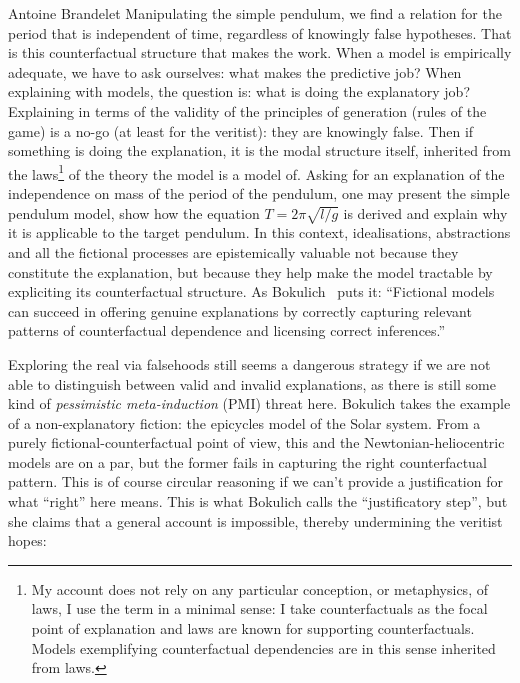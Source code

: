 \begin{artengenv}{Antoine Brandelet}
Manipulating the simple pendulum, we find a relation for the period that is independent of time, regardless of knowingly false hypotheses. That is this counterfactual structure that makes the work. When a model is empirically adequate, we have to ask ourselves: what makes the predictive job? When explaining with models, the question is: what is doing the explanatory job? Explaining in terms of the validity of the principles of generation (rules of the game) is a no-go (at least for the veritist): they are knowingly false. Then if something is doing the explanation, it is the modal structure itself, inherited from the laws\footnote{My account does not rely on any particular conception, or metaphysics, of laws, I use the term in a minimal sense: I take counterfactuals as the focal point of explanation and laws are known for supporting counterfactuals. Models exemplifying counterfactual dependencies are in this sense inherited from laws.} of the theory the model is a model of. Asking for an explanation of the independence on mass of the period of the pendulum, one may present the simple pendulum model, show how the equation $T = 2\pi \sqrt{l/g}$ is derived and explain why it is applicable to the target pendulum. In this context, idealisations, abstractions and all the fictional processes are epistemically valuable not because they constitute the explanation, but because they help make the model tractable by expliciting its counterfactual structure. As Bokulich~\parencite*[p.1]{Bokulich2016} puts it: ``Fictional models can succeed in offering genuine explanations by correctly capturing relevant patterns of counterfactual dependence and licensing correct inferences.''

Exploring the real via falsehoods still seems a dangerous strategy if we are not able to distinguish between valid and invalid explanations, as there is still some kind of \textit{pessimistic meta-induction} (PMI) threat here. Bokulich takes the example of a non-explanatory fiction: the epicycles model of the Solar system. From a purely fictional-counterfactual point of view, this and the Newtonian-heliocentric models are on a par, but the former fails in capturing the right counterfactual pattern. This is of course circular reasoning if we can't provide a justification for what ``right'' here means. This is what Bokulich calls the ``justificatory step'', but she claims that a general account is impossible, thereby undermining the veritist hopes: 



\end{artengenv}
